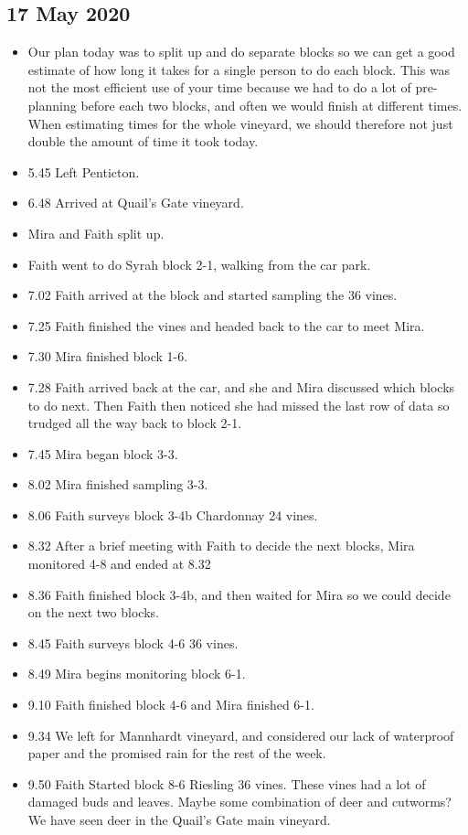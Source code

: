 \documentclass[11pt,letter]{article}
\newenvironment{smitemize}{
\begin{itemize}
  \setlength{\itemsep}{0pt}
  \setlength{\parskip}{0.8pt}
  \setlength{\parsep}{0pt}}
{\end{itemize}
}
\begin{document}
\subsection {17 May 2020}
\begin{smitemize}
\item Our plan today was to split up and do separate blocks so we can get a good estimate of how long it takes for a single person to do each block. This was not the most efficient use of your time because we had to do a lot of pre-planning before each two blocks, and often we would finish at different times. When estimating times for the whole vineyard, we should therefore not just double the amount of time it took today.
\item 5.45 Left Penticton.
\item 6.48 Arrived at Quail's Gate vineyard.
\item Mira and Faith split up. 
\item Faith went to do Syrah block 2-1, walking from the car park.
\item 7.02 Faith arrived at the block and started sampling the 36 vines.
\item 7.25 Faith finished the vines and headed back to the car to meet Mira.
\item 7.30 Mira finished block 1-6.
\item 7.28 Faith arrived back at the car, and she and Mira discussed which blocks to do next. Then Faith then noticed she had missed the last row of data so trudged all the way back to block 2-1.
\item 7.45 Mira began block 3-3.
\item 8.02 Mira finished sampling 3-3.
\item 8.06 Faith surveys block 3-4b Chardonnay 24 vines.
\item 8.32 After a brief meeting with Faith to decide the next blocks, Mira monitored 4-8 and ended at 8.32
\item 8.36 Faith finished block 3-4b, and then waited for Mira so we could decide on the next two blocks.
\item 8.45 Faith surveys block 4-6 36 vines.
\item 8.49 Mira begins monitoring block 6-1.
\item 9.10 Faith finished block 4-6 and Mira finished 6-1.
\item 9.34 We left for Mannhardt vineyard, and considered our lack of waterproof paper and the promised rain for the rest of the week. 
\item 9.50 Faith Started block 8-6 Riesling 36 vines. These vines had a lot of damaged buds and leaves. Maybe some combination of deer and cutworms? We have seen deer in the Quail's Gate main vineyard. 

\end{smitemize}
\end{document}
